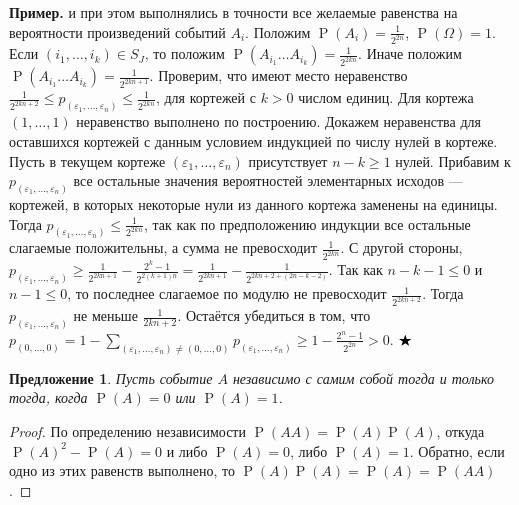 \documentclass[12pt]{article}
\newtheorem{proposition}[theorem]{Предложение}
\numberwithin{theorem}{section}
\theoremstyle{definition}
\newenvironment{example}{\indent \textbf{Пример.}}{$ \hfill \bigstar $}
\newcommand{\prob}{\operatorname{P}}
\begin{document}
\begin{example}
		и при этом выполнялись в точности все желаемые равенства на вероятности произведений событий $ A_i $.
		Положим $ \prob(A_i) = \tfrac{1}{2^{2n}} $, $ \prob(\Omega) = 1 $.
		Если $ (i_1, \ldots, i_k) \in S_{J} $, то положим $ \prob(A_{i_1}\ldots A_{i_k}) = \tfrac{1}{2^{2kn}} $.
		Иначе положим $ \prob(A_{i_1}\ldots A_{i_k}) = \tfrac{1}{2^{2kn + 1}} $.
		Проверим, что имеют место неравенство
		$ \tfrac{1}{2^{2kn + 2}} \leqslant p_{(\varepsilon_1, \ldots, \varepsilon_n)} \leqslant \tfrac{1}{2^{2kn}} $,
		для кортежей с $ k > 0 $ числом единиц.
		Для кортежа $ (1, \ldots, 1) $ неравенство выполнено по построению.
		Докажем неравенства для оставшихся кортежей с данным условием индукцией по числу нулей в кортеже.
		Пусть в текущем кортеже $ (\varepsilon_1, \ldots, \varepsilon_n) $ присутствует $ n - k \geqslant 1 $ нулей.
		Прибавим к $ p_{(\varepsilon_1, \ldots, \varepsilon_n)} $ все остальные значения вероятностей элементарных исходов
		--- кортежей, в которых некоторые нули из данного кортежа заменены на единицы.
		Тогда $ p_{(\varepsilon_1, \ldots, \varepsilon_n)} \leqslant \tfrac{1}{2^{2kn}} $,
		так как по предположению индукции все остальные слагаемые положительны, а сумма не превосходит $ \tfrac{1}{2^{2kn}} $.
		С другой стороны, 
		$ p_{(\varepsilon_1, \ldots, \varepsilon_n)} \geqslant \tfrac{1}{2^{2kn + 1}} - \tfrac{2^k - 1}{2^{2(k + 1)n}}
		= \tfrac{1}{2^{2kn + 1}} - \tfrac{1}{2^{2kn + 2 + (2n - k - 2)}} $.
		Так как $ n - k - 1 \leqslant 0 $ и $ n - 1 \leqslant 0 $, 
		то последнее слагаемое по модулю не превосходит $ \tfrac{1}{2^{2kn + 2}} $.
		Тогда $ p_{(\varepsilon_1, \ldots, \varepsilon_n)} $ не меньше $ \tfrac{1}{2kn + 2} $.
		Остаётся убедиться в том, что $ p_{(0, \ldots, 0)} 
		= 1 - \sum\limits_{(\varepsilon_1, \ldots, \varepsilon_n) \neq (0, \ldots, 0)} p_{(\varepsilon_1, \ldots, \varepsilon_n)}
		\geqslant 1 - \tfrac{2^n - 1}{2^{2n}} > 0 $.
	\end{example}
	
	\begin{proposition} \label{self independent}
		Пусть событие $ A $ независимо с самим собой тогда и только тогда, когда $ \prob(A) = 0 $ или $ \prob(A) = 1 $.
	\end{proposition}
	
	\begin{proof}
		По определению независимости $ \prob(AA) = \prob(A)\prob(A) $, откуда $ \prob(A)^2 - \prob(A) = 0 $
		и либо $ \prob(A) = 0 $, либо $ \prob(A) = 1 $. Обратно, если одно из этих равенств выполнено,
		то $ \prob(A)\prob(A) = \prob(A) = \prob(AA) $.
	\end{proof}
	
\end{document}
